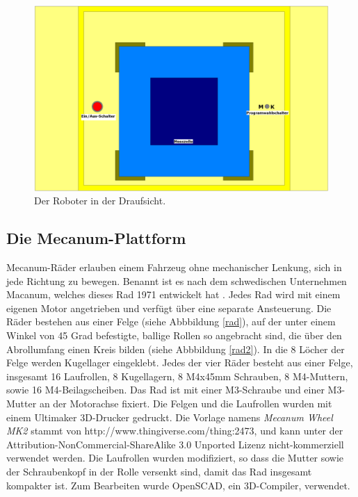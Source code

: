 \documentclass[a4paper,bibtotoc,oneside]{scrbook}
\begin{document}
\begin{figure}[htbp]
\centering
\includegraphics[width=125mm]{img/oben3.png}
\caption{Der Roboter in der Draufsicht.}\label{oben}
\end{figure}
  

\subsection{Die Mecanum-Plattform}\thispagestyle{empty}
Mecanum-Räder erlauben einem Fahrzeug ohne mechanischer Lenkung, sich in jede Richtung zu bewegen. Benannt ist es nach dem schwedischen Unternehmen Macanum, welches dieses Rad 1971 entwickelt hat \cite{mecanum}. 
Jedes Rad wird mit einem eigenen Motor angetrieben und verfügt über eine separate Ansteuerung. Die Räder bestehen aus einer Felge (siehe Abbbildung \ref{rad}), auf der unter einem Winkel von 45 Grad befestigte, ballige Rollen so angebracht sind, die über den Abrollumfang einen Kreis bilden (siehe Abbbildung \ref{rad2}). In die 8 Löcher der Felge werden Kugellager eingeklebt. Jedes der vier Räder besteht aus einer Felge, insgesamt 16 Laufrollen, 8 Kugellagern, 8 M4x45mm Schrauben, 8 M4-Muttern, sowie 16 M4-Beilagscheiben. 
Das Rad ist mit einer M3-Schraube und einer M3-Mutter an der Motorachse fixiert.
Die Felgen und die Laufrollen wurden mit einem Ultimaker 3D-Drucker \cite{um} gedruckt. 
Die Vorlage namens \textit{Mecanum Wheel MK2} stammt von http://www.thingiverse.com/thing:2473, und kann unter der Attribution-NonCommercial-ShareAlike 3.0 Unported Lizenz nicht-kommerziell verwendet werden.
Die Laufrollen wurden modifiziert, so dass die Mutter sowie der Schraubenkopf in der Rolle versenkt sind, damit das Rad insgesamt kompakter ist. Zum Bearbeiten wurde OpenSCAD, ein 3D-Compiler, verwendet. 
\end{document}
